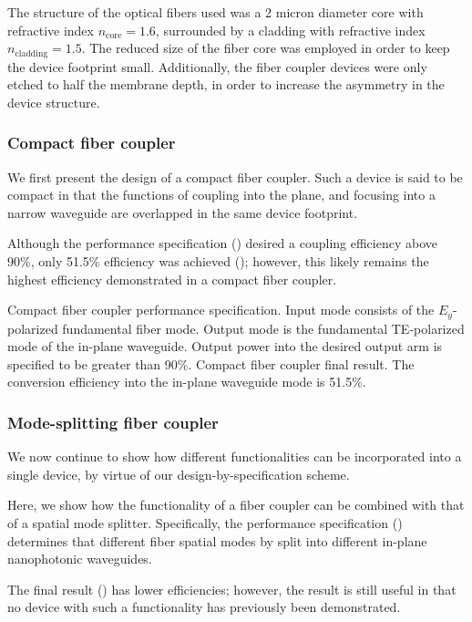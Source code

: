 The structure of the optical fibers used was a 2 micron diameter core with 
    refractive index $n_\text{core} = 1.6$,
    surrounded by a cladding with refractive index $n_\text{cladding}=1.5$.
The reduced size of the fiber core was employed in order
    to keep the device footprint small.
Additionally, the fiber coupler devices were only etched to half the membrane depth,
    in order to increase the asymmetry in the device structure.

\subsubsection{Compact fiber coupler}
We first present the design of a compact fiber coupler.
Such a device is said to be compact in that the functions
    of coupling into the plane, and focusing into a narrow waveguide
    are overlapped in the same device footprint.

Although the performance specification ()
    desired a coupling efficiency above 90\%,
    only 51.5\% efficiency was achieved ();
    however, this likely remains the highest efficiency demonstrated
    in a compact fiber coupler.

    {Compact fiber coupler performance specification.
    Input mode consists of the $E_y$-polarized fundamental fiber mode.
    Output mode is the fundamental TE-polarized mode of the in-plane waveguide.
    Output power into the desired output arm is specified to be greater than 90\%.}
    {Compact fiber coupler final result.
    The conversion efficiency into the in-plane waveguide mode is 51.5\%.}

\subsubsection{Mode-splitting fiber coupler}
We now continue to show how different functionalities
    can be incorporated into a single device,
    by virtue of our design-by-specification scheme.

Here, we show how the functionality of a fiber coupler
    can be combined with that of a spatial mode splitter.
Specifically, the performance specification ()
    determines that different fiber spatial modes
    by split into different in-plane nanophotonic waveguides.

The final result () has lower efficiencies;
    however, the result is still useful 
    in that no device with such a functionality has previously been demonstrated.

